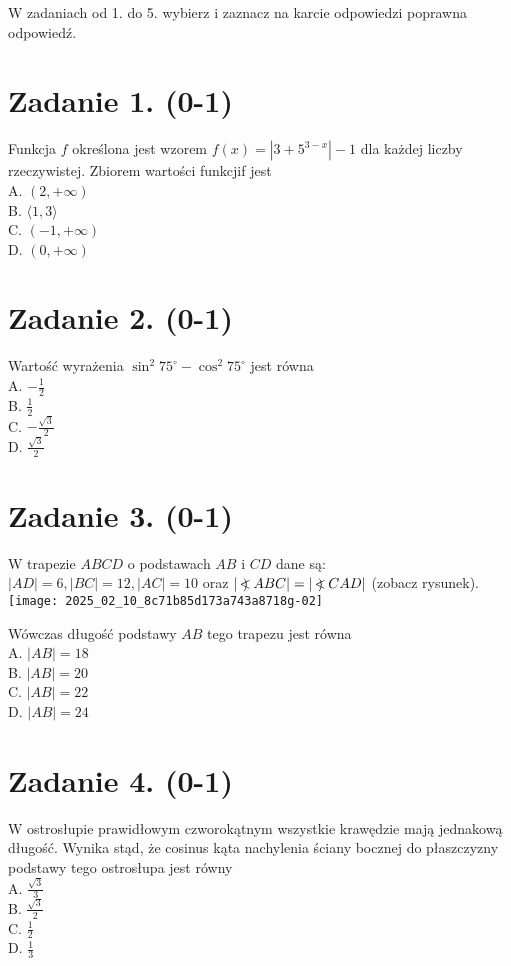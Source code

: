 \documentclass[10pt]{article}
\newcommand\Varangle{\mathop{{<\!\!\!\!\!\text{\small)}}\:}\nolimits}
\begin{document}
W zadaniach od 1. do 5. wybierz i zaznacz na karcie odpowiedzi poprawna odpowiedź.

\section*{Zadanie 1. (0-1)}
Funkcja \(f\) określona jest wzorem \(f(x)=\left|3+5^{3-x}\right|-1\) dla każdej liczby rzeczywistej. Zbiorem wartości funkcjif jest\\
A. \((2,+\infty)\)\\
B. \(\langle 1,3\rangle\)\\
C. \((-1,+\infty)\)\\
D. \((0,+\infty)\)

\section*{Zadanie 2. (0-1)}
Wartość wyrażenia \(\sin ^{2} 75^{\circ}-\cos ^{2} 75^{\circ}\) jest równa\\
A. \(-\frac{1}{2}\)\\
B. \(\frac{1}{2}\)\\
C. \(-\frac{\sqrt{3}}{2}\)\\
D. \(\frac{\sqrt{3}}{2}\)

\section*{Zadanie 3. (0-1)}
W trapezie \(A B C D\) o podstawach \(A B\) i \(C D\) dane są: \(|A D|=6,|B C|=12,|A C|=10\) oraz \(|\Varangle A B C|=|\Varangle C A D|\) (zobacz rysunek).\\
\texttt{[image: 2025\_02\_10\_8c71b85d173a743a8718g-02]}

Wówczas długość podstawy \(A B\) tego trapezu jest równa\\
A. \(|A B|=18\)\\
B. \(|A B|=20\)\\
C. \(|A B|=22\)\\
D. \(|A B|=24\)

\section*{Zadanie 4. (0-1)}
W ostrosłupie prawidłowym czworokątnym wszystkie krawędzie mają jednakową długość. Wynika stąd, że cosinus kąta nachylenia ściany bocznej do płaszczyzny podstawy tego ostrosłupa jest równy\\
A. \(\frac{\sqrt{3}}{3}\)\\
B. \(\frac{\sqrt{3}}{2}\)\\
C. \(\frac{1}{2}\)\\
D. \(\frac{1}{3}\)
\end{document}
